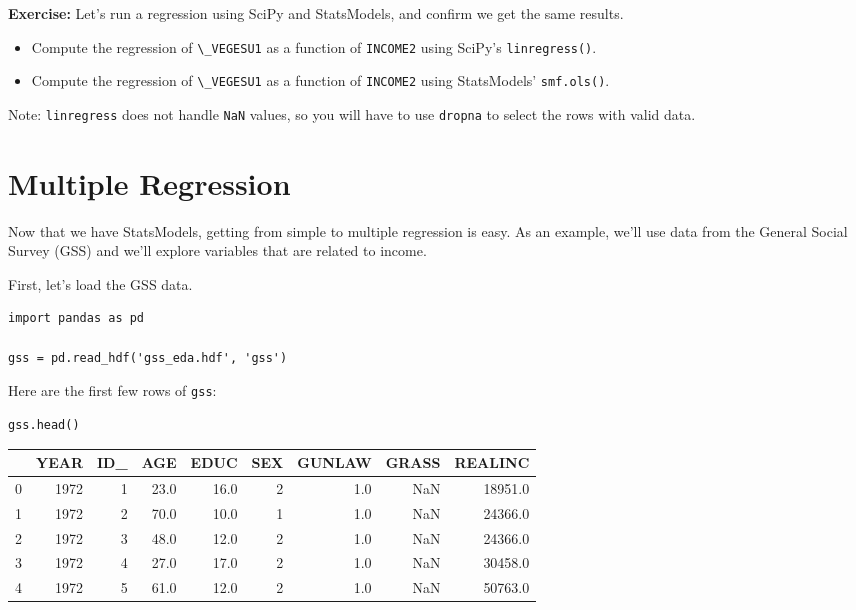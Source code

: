 \textbf{Exercise:} Let's run a regression using SciPy and StatsModels,
and confirm we get the same results.

\begin{itemize}
\item
  Compute the regression of \passthrough{\lstinline!\_VEGESU1!} as a
  function of \passthrough{\lstinline!INCOME2!} using SciPy's
  \passthrough{\lstinline!linregress()!}.
\item
  Compute the regression of \passthrough{\lstinline!\_VEGESU1!} as a
  function of \passthrough{\lstinline!INCOME2!} using StatsModels'
  \passthrough{\lstinline!smf.ols()!}.
\end{itemize}

Note: \passthrough{\lstinline!linregress!} does not handle
\passthrough{\lstinline!NaN!} values, so you will have to use
\passthrough{\lstinline!dropna!} to select the rows with valid data.

\hypertarget{multiple-regression}{%
\section{Multiple Regression}\label{multiple-regression}}

Now that we have StatsModels, getting from simple to multiple regression
is easy. As an example, we'll use data from the General Social Survey
(GSS) and we'll explore variables that are related to income.

First, let's load the GSS data.

\begin{lstlisting}[]
import pandas as pd

gss = pd.read_hdf('gss_eda.hdf', 'gss')
\end{lstlisting}

Here are the first few rows of \passthrough{\lstinline!gss!}:

\begin{lstlisting}[]
gss.head()
\end{lstlisting}

\begin{tabular}{lrrrrrrrr}
\midrule
{} &  YEAR &  ID\_ &   AGE &  EDUC &  SEX &  GUNLAW &  GRASS &  REALINC \\
\midrule
0 &  1972 &    1 &  23.0 &  16.0 &    2 &     1.0 &    NaN &  18951.0 \\
1 &  1972 &    2 &  70.0 &  10.0 &    1 &     1.0 &    NaN &  24366.0 \\
2 &  1972 &    3 &  48.0 &  12.0 &    2 &     1.0 &    NaN &  24366.0 \\
3 &  1972 &    4 &  27.0 &  17.0 &    2 &     1.0 &    NaN &  30458.0 \\
4 &  1972 &    5 &  61.0 &  12.0 &    2 &     1.0 &    NaN &  50763.0 \\
\midrule
\end{tabular}

